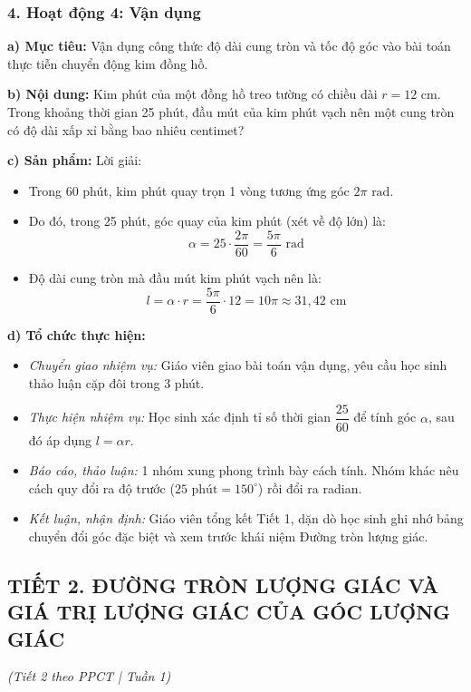 \documentclass[12pt, a4paper]{article}
\begin{document}
\subsubsection*{4. Hoạt động 4: Vận dụng}
\textbf{a) Mục tiêu:} Vận dụng công thức độ dài cung tròn và tốc độ góc vào bài toán thực tiễn chuyển động kim đồng hồ.

\textbf{b) Nội dung:} Kim phút của một đồng hồ treo tường có chiều dài $r = 12\text{ cm}$. Trong khoảng thời gian 25 phút, đầu mút của kim phút vạch nên một cung tròn có độ dài xấp xỉ bằng bao nhiêu centimet?

\textbf{c) Sản phẩm:} Lời giải:
\begin{itemize}[leftmargin=0.6cm]
    \item Trong 60 phút, kim phút quay trọn 1 vòng tương ứng góc $2\pi\text{ rad}$.
    \item Do đó, trong 25 phút, góc quay của kim phút (xét về độ lớn) là:
    $$\alpha = 25 \cdot \dfrac{2\pi}{60} = \dfrac{5\pi}{6}\text{ rad}$$
    \item Độ dài cung tròn mà đầu mút kim phút vạch nên là:
    $$l = \alpha \cdot r = \dfrac{5\pi}{6} \cdot 12 = 10\pi \approx 31{,}42\text{ cm}$$
\end{itemize}

\textbf{d) Tổ chức thực hiện:}
\begin{itemize}[leftmargin=0.6cm]
    \item \textit{Chuyển giao nhiệm vụ:} Giáo viên giao bài toán vận dụng, yêu cầu học sinh thảo luận cặp đôi trong 3 phút.
    \item \textit{Thực hiện nhiệm vụ:} Học sinh xác định tỉ số thời gian $\dfrac{25}{60}$ để tính góc $\alpha$, sau đó áp dụng $l = \alpha r$.
    \item \textit{Báo cáo, thảo luận:} 1 nhóm xung phong trình bày cách tính. Nhóm khác nêu cách quy đổi ra độ trước ($25\text{ phút} = 150^\circ$) rồi đổi ra radian.
    \item \textit{Kết luận, nhận định:} Giáo viên tổng kết Tiết 1, dặn dò học sinh ghi nhớ bảng chuyển đổi góc đặc biệt và xem trước khái niệm Đường tròn lượng giác.
\end{itemize}

\vspace{10pt}
\subsection*{TIẾT 2. ĐƯỜNG TRÒN LƯỢNG GIÁC VÀ GIÁ TRỊ LƯỢNG GIÁC CỦA GÓC LƯỢNG GIÁC}
\textit{(Tiết 2 theo PPCT | Tuần 1)}
\end{document}
